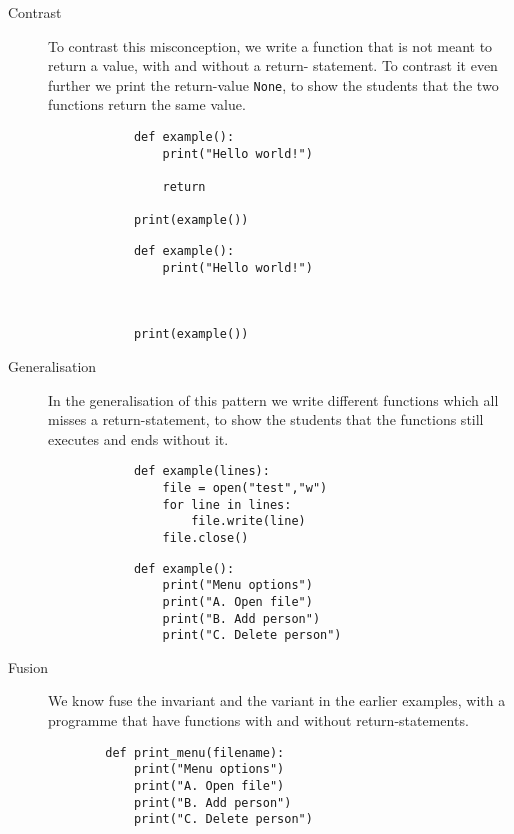 \begin{description}
    \item[Contrast] To contrast this misconception, we write a function 
that is not meant to return a value, with and without a return-
statement. To contrast it even further we print the return-value 
\texttt{None}, to show the students that the two functions 
return the same value. 

      \hfill
     \begin{minipage}[t]{0.45\columnwidth}
        \begin{verbatim}
            def example():
                print("Hello world!")

                return

            print(example())
        \end{verbatim}
    \end{minipage}
\hfill
    \begin{minipage}[t]{0.45\columnwidth}
        \begin{verbatim}
            def example():
                print("Hello world!")



            print(example())
        \end{verbatim}
    \end{minipage}
\hfill

    
    \item[Generalisation] In the generalisation of this pattern we write 
different functions which all misses a return-statement, to show the 
students that the functions still executes and ends without it. 

    \hfill
     \begin{minipage}[t]{0.45\columnwidth}
        \begin{verbatim}
            def example(lines):
                file = open("test","w")
                for line in lines: 
                    file.write(line)
                file.close()
        \end{verbatim}
    \end{minipage}
\hfill
    \begin{minipage}[t]{0.45\columnwidth}
        \begin{verbatim}
            def example():
                print("Menu options")
                print("A. Open file")
                print("B. Add person")
                print("C. Delete person")
        \end{verbatim}
    \end{minipage}
\hfill
    \item[Fusion] We know fuse the invariant and the variant in the 
earlier examples, with a programme that have functions with and 
without return-statements. 
    \hfill
        \begin{verbatim}
        def print_menu(filename):
            print("Menu options")
            print("A. Open file")
            print("B. Add person")
            print("C. Delete person")
            

\end{verbatim}
\end{description}
